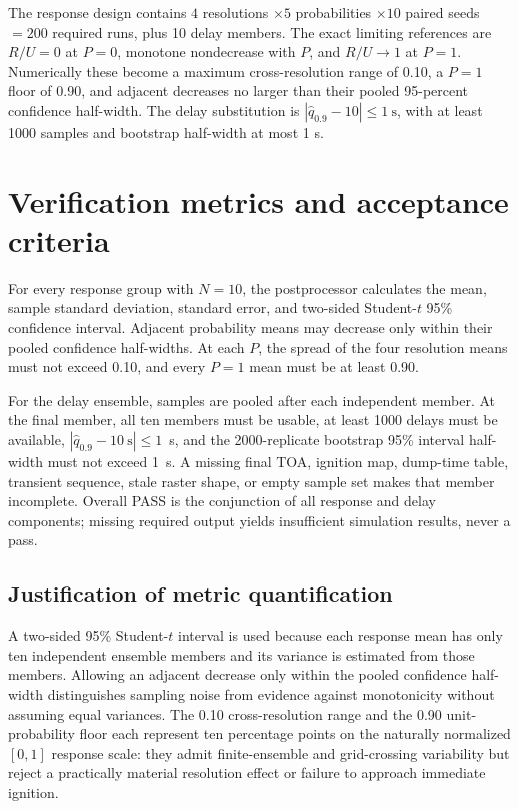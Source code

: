 The response design contains
\(4\) resolutions \(\times5\) probabilities \(\times10\) paired seeds
\(=200\) required runs, plus 10 delay members.  The exact limiting references
are \(R/U=0\) at \(P=0\), monotone nondecrease with \(P\), and \(R/U\to1\)
at \(P=1\).  Numerically these become a maximum cross-resolution range of
0.10, a \(P=1\) floor of 0.90, and adjacent decreases no larger than their
pooled 95-percent confidence half-width.  The delay substitution is
\(|\widehat q_{0.9}-10|\leq1~\mathrm{s}\), with at least 1000 samples and
bootstrap half-width at most 1 s.

\section{Verification metrics and acceptance criteria}
For every response group with $N=10$, the postprocessor calculates the mean,
sample standard deviation, standard error, and two-sided Student-$t$ 95\%
confidence interval. Adjacent probability means may decrease only within their
pooled confidence half-widths. At each $P$, the spread of the four resolution
means must not exceed 0.10, and every $P=1$ mean must be at least 0.90.

For the delay ensemble, samples are pooled after each independent member. At the
final member, all ten members must be usable, at least 1000 delays must be
available, $|\widehat q_{0.9}-10~\mathrm{s}|\le1$~s, and the 2000-replicate
bootstrap 95\% interval half-width must not exceed 1~s. A missing final TOA,
ignition map, dump-time table, transient sequence, stale raster shape, or empty
sample set makes that member incomplete. Overall PASS is the conjunction of all
response and delay components; missing required output yields
insufficient simulation results, never a pass.

\subsection{Justification of metric quantification}

A two-sided 95\% Student-\(t\) interval is used because each response mean has
only ten independent ensemble members and its variance is estimated from those
members.  Allowing an adjacent decrease only within the pooled confidence
half-width distinguishes sampling noise from evidence against monotonicity
without assuming equal variances.  The 0.10 cross-resolution range and the
0.90 unit-probability floor each represent ten percentage points on the
naturally normalized \([0,1]\) response scale: they admit finite-ensemble and
grid-crossing variability but reject a practically material resolution effect
or failure to approach immediate ignition.

